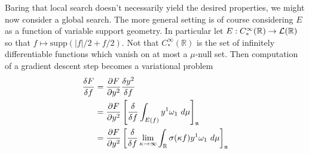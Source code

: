 \documentclass[12pt]{article}
\begin{document}
\begin{itemize}
	Baring that local search doesn't necessarily yield the desired properties, we might now consider a global search.
	The more general setting is of course considering $E$ as a function of variable support geometry. In particular let $E: C^{\infty}_*(\mathbb{R}) \to {\mathcal L}(\mathbb{R})$ so that $f \mapsto \text{supp}(|f|/2 + f/2).$ Not that $C^{\infty}_*(\mathbb{R})$ is the set of infinitely differentiable functions which vanish on at most a $\mu$-null set. Then computation of a gradient descent step becomes a variational problem
	\begin{equation*}
		\begin{aligned}
			\frac{\delta F}{\delta f} &= \frac{\partial F}{\partial y^2} \frac{\delta y^2}{\delta f}  \\
			&= \frac{\partial F}{\partial y^2} \left[\frac{\delta}{\delta f} \int_{E(f)} y^1 \omega_1\ d\mu \right]_{\mathfrak{n}} \\
			&= \frac{\partial F}{\partial y^2} \left[\frac{\delta}{\delta f} \lim_{\kappa \to \infty}\int_{{\mathbb R}} {\sigma}(\kappa f) y^1 \omega_1\ d\mu \right]_{\mathfrak{n}}
		\end{aligned}
	\end{equation*}


\end{itemize}
\end{document}
